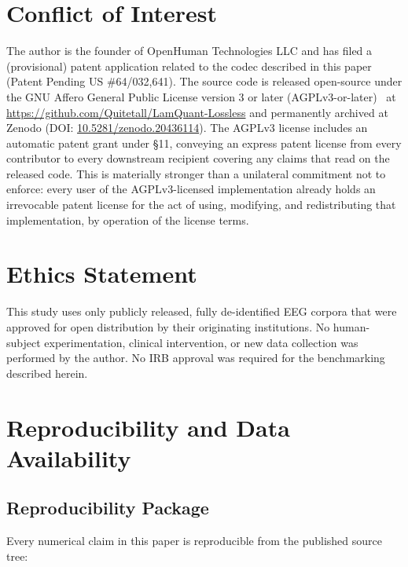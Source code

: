 \documentclass[journal]{IEEEtran}
\begin{document}
\section*{Conflict of Interest}
The author is the founder of OpenHuman Technologies LLC and has
filed a (provisional) patent application related to the codec
described in this paper (Patent Pending US \#64/032,641). The
source code is released open-source under the GNU Affero General Public
License version 3 or later (AGPLv3-or-later)~\cite{agpl3} at
\url{https://github.com/Quitetall/LamQuant-Lossless} and permanently
archived at Zenodo (DOI:
\href{https://doi.org/10.5281/zenodo.20436114}{10.5281/zenodo.20436114}).
The AGPLv3 license
includes an automatic patent grant under \S 11, conveying an
express patent license from every contributor to every downstream
recipient covering any claims that read on the released code.
This is materially stronger than a unilateral commitment not to
enforce: every user of the AGPLv3-licensed implementation already
holds an irrevocable patent license for the act of using,
modifying, and redistributing that implementation, by operation
of the license terms.

\section*{Ethics Statement}
This study uses only publicly released, fully de-identified EEG
corpora that were approved for open distribution by their
originating institutions. No human-subject experimentation,
clinical intervention, or new data collection was performed by
the author. No IRB approval was required for the benchmarking
described herein.

\section*{Reproducibility and Data Availability}

\subsection*{Reproducibility Package}
Every numerical claim in this paper is reproducible from the
published source tree:
\end{document}

